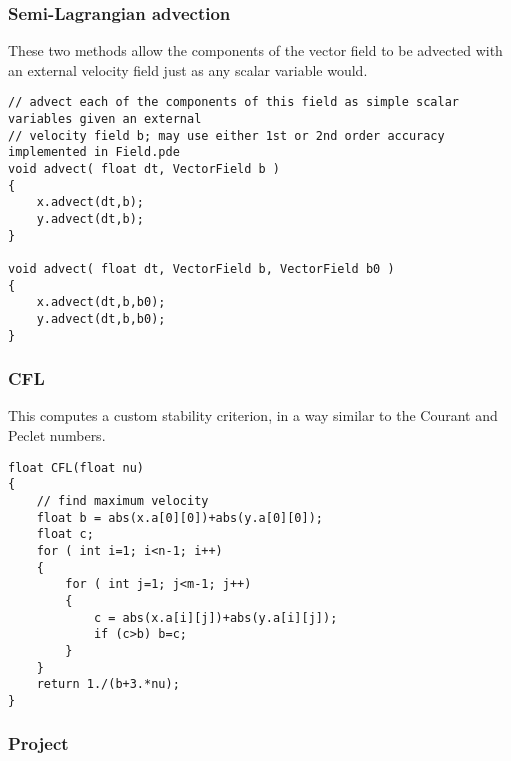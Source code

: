\documentclass[notitlepage]{article}
\begin{document}
\subsubsection{Semi-Lagrangian advection}

These two methods allow the components of the vector field to be advected with an external velocity
field just as any scalar variable would.

\begin{lstlisting}[style=myCpp]
// advect each of the components of this field as simple scalar variables given an external
// velocity field b; may use either 1st or 2nd order accuracy implemented in Field.pde
void advect( float dt, VectorField b )
{
	x.advect(dt,b);
	y.advect(dt,b);
}

void advect( float dt, VectorField b, VectorField b0 )
{
	x.advect(dt,b,b0);
	y.advect(dt,b,b0);
}
\end{lstlisting}

\subsubsection{CFL}

This computes a custom stability criterion, in a way similar to the Courant and Peclet numbers.

\begin{lstlisting}[style=myCpp]
float CFL(float nu)
{
	// find maximum velocity
	float b = abs(x.a[0][0])+abs(y.a[0][0]);
	float c;
	for ( int i=1; i<n-1; i++)
	{
		for ( int j=1; j<m-1; j++)
		{ 
			c = abs(x.a[i][j])+abs(y.a[i][j]);
			if (c>b) b=c;
		}
	}
	return 1./(b+3.*nu);
}
\end{lstlisting}

\subsubsection{Project}
\end{document}
